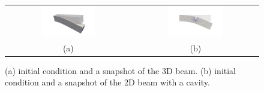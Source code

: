 \begin{figure}[t] 
\begin{tabular}{cc}
\includegraphics[width=0.45\textwidth]{./images/paper2/beam3d.png} & \includegraphics[width=0.45\textwidth]{./images/paper2/beam2d.png} \\
(a) & (b)
\end{tabular}
\caption{(a) initial condition and a snapshot of the 3D beam. (b) initial condition and a snapshot of the 2D beam with a cavity. } \label{fig:0}
\end{figure}

